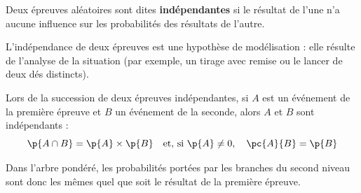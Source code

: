 \begin{defin}
	Deux épreuves aléatoires sont dites \textbf{indépendantes} si le résultat de l'une n'a aucune influence sur les probabilités des résultats de l'autre.
\end{defin}

\begin{rem}
	L'indépendance de deux épreuves est une hypothèse de modélisation : elle résulte de l'analyse de la situation (par exemple, un tirage avec remise ou le lancer de deux dés distincts).
\end{rem}

\begin{prop}
	Lors de la succession de deux épreuves indépendantes, si $A$ est un événement de la première épreuve et $B$ un événement de la seconde, alors $A$ et $B$ sont indépendants :
	\[
		\p{A \cap B} = \p{A} \times \p{B} \quad\text{et, si } \p{A} \neq 0, \quad \pc{A}{B} = \p{B}
	\]

	Dans l'arbre pondéré, les probabilités portées par les branches du second niveau sont donc les mêmes quel que soit le résultat de la première épreuve.
\end{prop}

